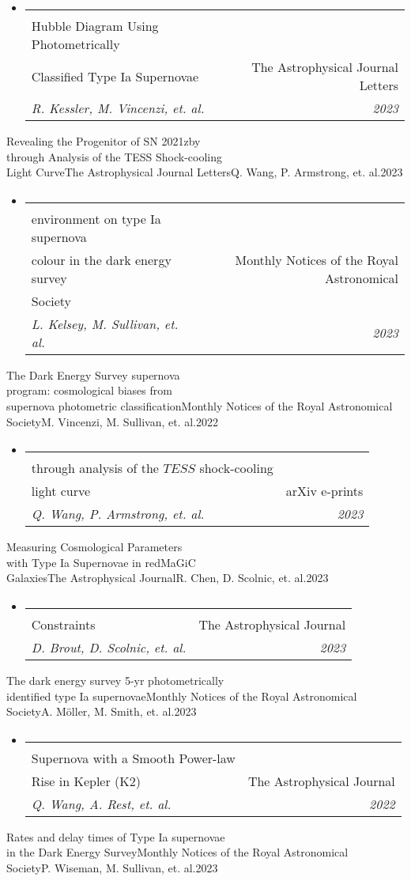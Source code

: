 \documentclass[letterpaper,11pt]{article}
\makeatletter
\newcommand{\resumeItem}[1]{
  \item\small{
    {#1 \vspace{-2pt}}
  }
}
\newcommand{\resumeSubheading}[4]{
  \vspace{-2pt}\item
    \begin{tabular*}{0.97\textwidth}[t]{l@{\extracolsep{\fill}}r}
      \textbf{#1} & #2 \\
      \textit{\small#3} & \textit{\small #4} \\
    \end{tabular*}\vspace{-7pt}
}
\newcommand{\resumeSubHeadingListStart}{\begin{itemize}[leftmargin=0.15in, label={}]}
\newcommand{\resumeSubHeadingListEnd}{\end{itemize}}
\newcommand{\resumeItemListStart}{\begin{itemize}}
\newcommand{\resumeItemListEnd}{\end{itemize}\vspace{-5pt}}
\newcommand{\publicationElement}[5]{%
    \resumeSubHeadingListStart
        \resumeSubheading
            {#1}
            {#2}
            {#3}
            {#4}
            \ifthenelse{\isempty{#5}}{}{%
                \resumeItemListStart
                    \renewcommand*{\do}[1]{\resumeItem{##1}}
                    \docsvlist{#5}%
                \resumeItemListEnd
            }%
    \resumeSubHeadingListEnd
}
\makeatother
\begin{document}
        \publicationElement{Binning is Sinning: Redemption for\\Hubble Diagram Using Photometrically\\Classified Type Ia Supernovae}{The Astrophysical Journal Letters}{R. Kessler, M. Vincenzi, et. al.}{2023}
        \publicationElement{Revealing the Progenitor of SN 2021zby\\through Analysis of the TESS Shock-cooling\\Light Curve}{The Astrophysical Journal Letters}{Q. Wang, P. Armstrong, et. al.}{2023}
        \publicationElement{Concerning colour: The effect of\\environment on type Ia supernova\\colour in the dark energy survey}{Monthly Notices of the Royal Astronomical\\Society}{L. Kelsey, M. Sullivan, et. al.}{2023}
        \publicationElement{The Dark Energy Survey supernova\\program: cosmological biases from\\supernova photometric classification}{Monthly Notices of the Royal Astronomical\\Society}{M. Vincenzi, M. Sullivan, et. al.}{2022}
        \publicationElement{Revealing the progenitor of SN 2021zby\\through analysis of the $TESS$ shock-cooling\\light curve}{arXiv e-prints}{Q. Wang, P. Armstrong, et. al.}{2023}
        \publicationElement{Measuring Cosmological Parameters\\with Type Ia Supernovae in redMaGiC\\Galaxies}{The Astrophysical Journal}{R. Chen, D. Scolnic, et. al.}{2023}
        \publicationElement{The Pantheon+ Analysis: Cosmological\\Constraints}{The Astrophysical Journal}{D. Brout, D. Scolnic, et. al.}{2023}
        \publicationElement{The dark energy survey 5-yr photometrically\\identified type Ia supernovae}{Monthly Notices of the Royal Astronomical\\Society}{A. Möller, M. Smith, et. al.}{2023}
        \publicationElement{SN 2018agk: A Prototypical Type Ia\\Supernova with a Smooth Power-law\\Rise in Kepler (K2)}{The Astrophysical Journal}{Q. Wang, A. Rest, et. al.}{2022}
        \publicationElement{Rates and delay times of Type Ia supernovae\\in the Dark Energy Survey}{Monthly Notices of the Royal Astronomical\\Society}{P. Wiseman, M. Sullivan, et. al.}{2023}
\end{document}
